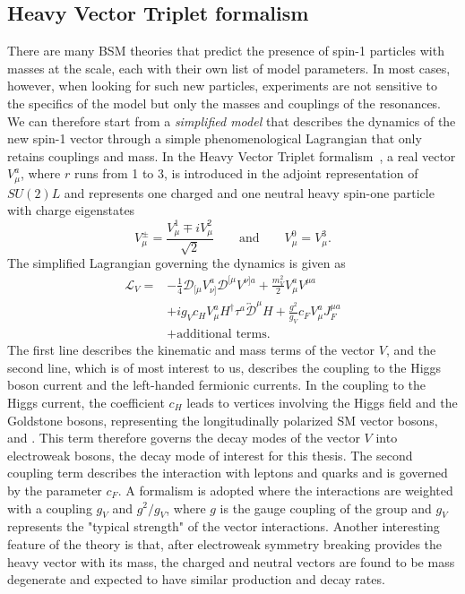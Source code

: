 \subsection{Heavy Vector Triplet formalism}
\label{sec:theory:hvt}
There are many BSM theories that predict the presence of spin-1 particles with masses at the \TeV scale, each with their own list of model parameters. In most cases, however, when looking for such new particles, experiments are not sensitive to the specifics of the model but only the masses and couplings of the resonances. We can therefore start from a \emph{simplified model} that describes the dynamics of the new spin-1 vector through a simple phenomenological Lagrangian that only retains couplings and mass. In the Heavy Vector Triplet formalism~\cite{Pappadopulo:2014qza}, a real vector $V_{\mu}^a$, where $r$ runs from 1 to 3, is introduced in the adjoint representation of $SU(2)L$ and represents one charged
and one neutral heavy spin-one particle with charge eigenstates
\begin{equation}\label{eqn:HVT_1}
V^\pm_\mu = \frac{V^1_\mu \mp iV^2_\mu}{\sqrt{2}} \qquad \textrm{and}\qquad V^0_\mu = V^3_\mu.
\end{equation}
The simplified Lagrangian governing the dynamics is given as
\begin{equation}
\begin{split}
\mathcal{L}_V = & -\frac{1}{4}\mathcal{D}_{[\mu}V^a_{\nu]}\mathcal{D}^{[\mu}V^{\nu]a} + \frac{m^2_V}{2}V^a_\mu V^{\mu a}\\
 & + ig_Vc_HV^a_\mu H^\dag\tau^a\overleftrightarrow{\mathcal{D}}^\mu H + \frac{g^2}{g_V}c_FV^a_\mu J^{\mu a}_F\\
 & + \mbox{additional terms.}
 \end{split}
\end{equation}
The first line describes the kinematic and mass terms of the vector $V$, and the second line, which is of most interest to us, describes the coupling to the Higgs boson current and the left-handed fermionic currents.
In the coupling to the Higgs current, the coefficient $c_H$ leads to vertices involving the Higgs field and the Goldstone bosons, representing the longitudinally polarized SM vector bosons, \PW and \PZ.
This term therefore governs the decay modes of the vector $V$ into electroweak bosons, the decay mode of interest for this thesis. The second coupling term describes the interaction with leptons and quarks and is governed by the parameter $c_F$. A formalism is adopted where the interactions are weighted with a coupling $g_V$ and $g^2/g_V$, where $g$ is the gauge coupling of the group and $g_V$ represents the "typical strength" of the vector interactions. Another interesting feature of the theory is that, after electroweak symmetry breaking provides the heavy vector with its mass, the charged and neutral vectors are found to be mass degenerate and expected to have similar production and decay rates.\newline
